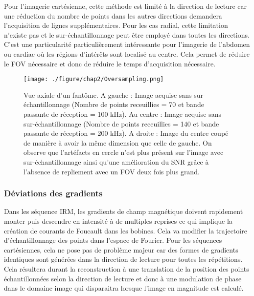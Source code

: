 Pour l'imagerie cartésienne, cette méthode est limité à la direction de lecture car une réduction du nombre de points dans les autres directions demandera l'acquisition de lignes supplémentaires. Pour les cas radial, cette limitation n'existe pas et le sur-échantillonnage peut être employé dans toutes les directions. C'est une particularité particulièrement  intéressante pour l'imagerie de l'abdomen ou cardiac \cite{block2014towards,Johnson:2012uq} où les régions d'intérêts sont localisé au centre. Cela permet de réduire le FOV nécessaire et donc de réduire le temps d'acquisition nécessaire.

\begin{figure}[H]
\centering
\texttt{[image: ./figure/chap2/Oversampling.png]}
\caption[Artéfact de flux]{\label{fig:Oversampling} Vue axiale d'un fantôme. A gauche : Image acquise sans sur-échantillonnage (Nombre de points receuillies = 70 et bande passante de réception = 100 kHz). Au centre : Image acquise sans sur-échantillonnage (Nombre de points receuillies = 140 et bande passante de réception = 200 kHz). A droite : Image du centre coupé de manière à avoir la même dimension que celle de gauche. On observe que l'artéfacts en cercle n'est plus présent sur l'image avec sur-échantillonnage ainsi qu'une amélioration du SNR grâce à l'absence de repliement avec un FOV deux fois plus grand.}
\end{figure}

\subsubsection{Déviations des gradients}

Dans les séquence IRM, les gradients de champ magnétique doivent rapidement monter puis descendre en intensité à de multiples reprises ce qui implique la création de courants de Foucault dans les bobines. Cela va modifier la trajectoire d'échantillonnage des points dans l'espace de Fourier.
Pour les séquences cartésiennes, cela ne pose pas de problème majeur car des formes de gradients identiques sont générées dans la direction de lecture pour toutes les répétitions. Cela résultera durant la reconstruction à une translation de la position des points échantillonnées selon la direction de lecture et donc à une modulation de phase dans le domaine image qui disparaitra lorsque l'image en magnitude est calculé.

